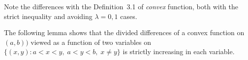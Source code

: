 Note the differences with the Definition~3.1 of \emph{convex} function,
both with the strict inequality and avoiding \(\lambda=0,1\) cases.

\iffalse
\begin{llem} \label{lem:convex:stu}
If \(\varphi\) is strictly convex on \((a,b)\)
then for any $s$,$t$,$u$ such that \(s<t<u\)
\begin{equation} \label{eq:convex:stu}
\frac{\varphi(t) - \varphi(s)}{t-s} < \frac{\varphi(u) - \varphi(t)}{u-t}
\end{equation}
\end{llem}
\begin{thmproof}
Using \(\lambda = (t-s)(u-s)\),
we make several simple derivations from (\ref{eq:convex:def})
\begin{eqnarray}
 \varphi(t) &<& \frac{u-t}{u-s}\varphi(s) + \frac{t-s}{u-s}\varphi(t) \notag \\
  (u-t \;+\; t-s)\varphi(t) &<& (u-t)\varphi(s) + (t-s)\varphi(t) \notag \\
  (u-t)\bigl((\varphi(t) - \varphi(s)\bigr)
 &<& \notag
  (t-s)\bigl(\varphi(u) - \varphi(t)\bigr) \\
  u\varphi(t) - u\varphi(s) - t\varphi(t) + t\varphi(s)
 &<& \notag
  t\varphi(u) - t\varphi(s) - s\varphi(u) + s\varphi(t) \\
  (u-t)\bigl(\varphi(t) - \varphi(s)\bigr)
&<& \notag
    (t-s)\bigl(\varphi(u) - \varphi(t)\bigr) \\
\frac{\varphi(t) - \varphi(s)}{t-s} &<& \frac{\varphi(u) - \varphi(t)}{u-t}
\end{eqnarray}
\end{thmproof}
\fi

The following lemma shows that the divided differences of
a convex function on \((a,b))\) viewed as a function of
two variables on \(\{(x,y): a<x<y,\; a<y<b,\; x\neq y\}\)
is strictly increasing in each variable.

